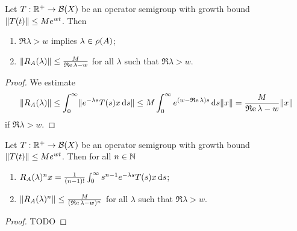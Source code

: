\begin{corollary} \label{resolventGeneratorEstimate}
Let $T: \mathbb{R}^+\to \operatorname{\mathcal{B}}(X)$ be an operator semigroup with growth bound $\lVert T(t)\rVert\leq Me^{wt}$. Then
\begin{enumerate}
\item $\Re \lambda > w$ implies $\lambda \in\rho(A)$;
\item $\lVert R_A(\lambda)\rVert \leq \frac{M}{\operatorname{\mathfrak{R}e} \lambda - w}$ for all $\lambda$ such that $\Re \lambda > w$.
\end{enumerate}
\end{corollary}
\begin{proof}
We estimate
\[ \lVert R_A(\lambda)\rVert \leq \int_0^\infty\lVert e^{-\lambda s}T(s)x\operatorname{d \!}{s}\rVert \leq M\int_0^\infty e^{(w-\operatorname{\mathfrak{R}e}\lambda)s}\operatorname{d \!}{s}\lVert x\rVert = \frac{M}{\operatorname{\mathfrak{R}e}\lambda - w}\lVert x\rVert \]
if $\Re \lambda > w$. 
\end{proof}
\begin{corollary} \label{resolventGeneratorPowerEstimate}
Let $T: \mathbb{R}^+\to \operatorname{\mathcal{B}}(X)$ be an operator semigroup with growth bound $\lVert T(t)\rVert\leq Me^{wt}$. Then for all $n\in \mathbb{N}$
\begin{enumerate}
\item $R_A(\lambda)^n x = \frac{1}{(n-1)!}\int_0^\infty s^{n-1}e^{-\lambda s}T(s)x\operatorname{d \!}{s}$;
\item $\lVert R_A(\lambda)^n\rVert \leq \frac{M}{(\operatorname{\mathfrak{R}e} \lambda - w)^n}$ for all $\lambda$ such that $\Re \lambda > w$.
\end{enumerate}
\end{corollary}
\begin{proof}
TODO
\end{proof}

